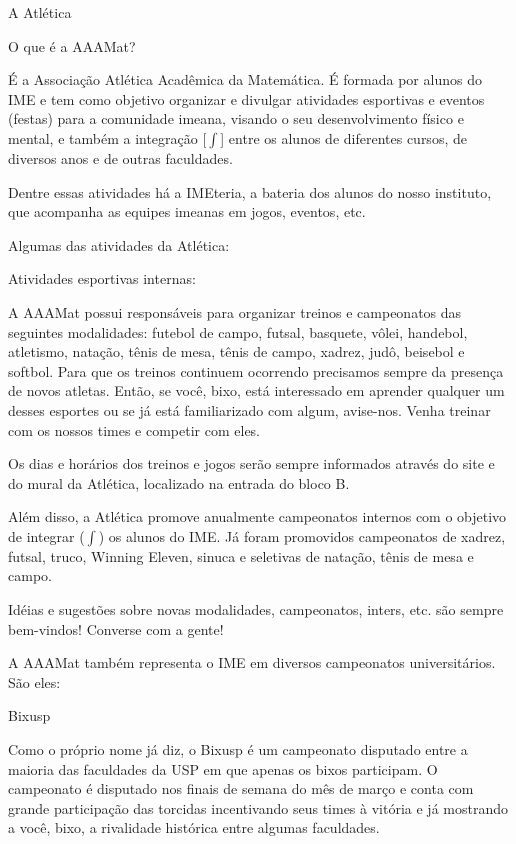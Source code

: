 \begin{secao}{A Atlética}

\begin{subsecao}{O que é a AAAMat?}

É a Associação Atlética Acadêmica da Matemática. É formada por alunos do IME e
tem como objetivo organizar e divulgar atividades esportivas e eventos (festas)
para a comunidade imeana, visando o seu desenvolvimento físico e mental,
e também a integração [$\int$] entre os alunos de diferentes cursos, de diversos
anos e de outras faculdades.

Dentre essas atividades há a IMEteria, a bateria dos alunos do nosso instituto,
que acompanha as equipes imeanas em jogos, eventos, etc.

\end{subsecao}

Algumas das atividades da Atlética:

\begin{subsecao}{Atividades esportivas internas:}

A AAAMat possui responsáveis para organizar treinos e campeonatos das seguintes 
modalidades: futebol de campo, futsal, basquete, vôlei, handebol, atletismo, 
natação, tênis de mesa, tênis de campo, xadrez, judô, beisebol e softbol. Para 
que os treinos continuem ocorrendo precisamos sempre da presença de novos 
atletas. Então, se você, bixo, está interessado em aprender qualquer um desses 
esportes ou se já está familiarizado com algum, avise-nos. Venha treinar com os 
nossos times e competir com eles.

Os dias e horários dos treinos e jogos serão sempre informados através do site
e do mural da Atlética, localizado na entrada do bloco B.

Além disso, a Atlética promove anualmente campeonatos internos com o objetivo de
integrar ($\int$) os alunos do IME. Já foram promovidos campeonatos de xadrez,
futsal, truco, Winning Eleven, sinuca e seletivas de natação, tênis de mesa e 
campo.

Idéias e sugestões sobre novas modalidades, campeonatos, inters, etc. são sempre
 bem-vindos! Converse com a gente!

\end{subsecao}

A AAAMat também representa o IME em diversos campeonatos universitários. São
eles:

\begin{subsecao}{Bixusp}

Como o próprio nome já diz, o Bixusp é um campeonato disputado entre a maioria
das faculdades da USP em que apenas os bixos participam. O campeonato é
disputado nos finais de semana do mês de março e conta com grande participação
das torcidas incentivando seus times à vitória e já mostrando a você, bixo, a
rivalidade histórica entre algumas faculdades.


\end{subsecao}
\end{secao}
